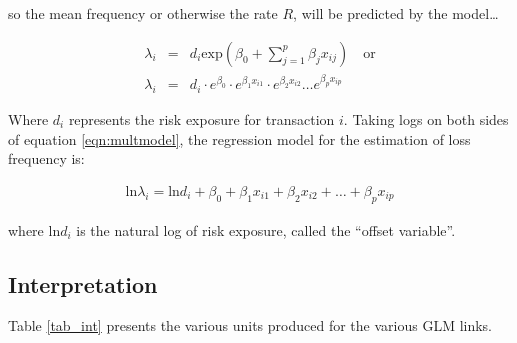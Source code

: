 \documentclass[]{article}
\begin{document}
\doublespacing

so the mean frequency or otherwise the rate \(R\), will be predicted by
the model\ldots

\singlespacing

\begin{eqnarray}\label{eqn:multmodel}
\lambda_i &=& d_i\mbox{exp}(\beta_0 + \sum_{j=1}^{p}\beta_jx_{ij}) \quad \mbox{or} \nonumber \\
\lambda_i &=& d_i\cdot e^{\beta_0}\cdot e^{\beta_1x_{i1}}\cdot e^{\beta_2x_{i2}} \ldots e^{\beta_px_{ip}}
\end{eqnarray}

\doublespacing

Where \(d_i\) represents the risk exposure for transaction \(i\). Taking
logs on both sides of equation \ref{eqn:multmodel}, the regression model
for the estimation of loss frequency is:

\singlespacing

\begin{eqnarray}
\mbox{ln}\lambda_i =  \mbox{ln}d_i + \beta_0 + \beta_1x_{i1} + \beta_2x_{i2} + \ldots + \beta_px_{ip}
\end{eqnarray}

\doublespacing

where \(\mbox{ln}d_i\) is the natural log of risk exposure, called the
``offset variable''.

\subsection{Interpretation}

Table \ref{tab_int} presents the various units produced for the various
GLM links.
\end{document}

